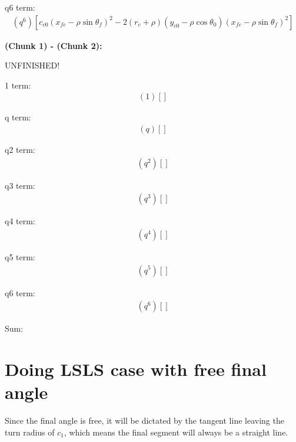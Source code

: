 \documentclass[12pt]{article}
\begin{document}
q6 term:
\begin{align*}
    (q^6)[ c_{c0}(x_{fc} - \rho\sin\theta_f)^2 - 2(r_c+\rho)(y_{c0} - \rho\cos\theta_0)(x_{fc} - \rho\sin\theta_f)^2 ]
\end{align*}





\textbf{(Chunk 1) - (Chunk 2):}

UNFINISHED!

1 term:
\begin{align*}
    (1)[]
\end{align*}

q term:
\begin{align*}
    (q)[]
\end{align*}

q2 term:
\begin{align*}
    (q^2)[]
\end{align*}

q3 term:
\begin{align*}
    (q^3)[]
\end{align*}

q4 term:
\begin{align*}
    (q^4)[]
\end{align*}

q5 term:
\begin{align*}
    (q^5)[]
\end{align*}

q6 term:
\begin{align*}
    (q^6)[]
\end{align*}

Sum:



\section{Doing LSLS case with free final angle}

Since the final angle is free, it will be dictated by the tangent line leaving the turn radius of $c_1$, which means the final segment will always be a straight line.
\end{document}
